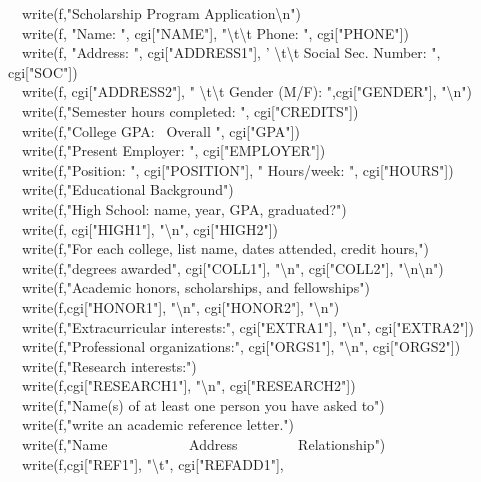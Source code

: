 {{\ \ write(f,"Scholarship Program
Application{\textbackslash}n") \\
\ \ write(f, "Name: ",
cgi["NAME"],
"{\textbackslash}t{\textbackslash}t Phone: ", cgi["PHONE"]) \\
\ \ write(f, "Address: ", cgi["ADDRESS1"], '
{\textbackslash}t{\textbackslash}t Social Sec. Number: ", cgi["SOC"]) \\
\ \ write(f, cgi["ADDRESS2"],
" {\textbackslash}t{\textbackslash}t Gender (M/F):
",cgi["GENDER"],
"{\textbackslash}n") \\
\ \ write(f,"Semester hours completed: ",
cgi["CREDITS"]) \\
\ \ write(f,"College GPA: \ Overall ",
cgi["GPA"]) \\
\ \ write(f,"Present Employer: ",
cgi["EMPLOYER"]) \\
\ \ write(f,"Position: ", cgi["POSITION"], " Hours/week: ", cgi["HOURS"]) \\
\ \ write(f,"Educational Background") \\
\ \ write(f,"High School: name, year, GPA,
		graduated?") \\
\ \ write(f, cgi["HIGH1"],
"{\textbackslash}n",
cgi["HIGH2"]) \\
\ \ write(f,"For each college, list name, dates attended,
credit hours,") \\
\ \ write(f,"degrees awarded", cgi["COLL1"], "{\textbackslash}n", cgi["COLL2"],
"{\textbackslash}n{\textbackslash}n") \\
\ \ write(f,"Academic honors, scholarships, and
fellowships") \\
\ \ write(f,cgi["HONOR1"],
"{\textbackslash}n",
cgi["HONOR2"],
"{\textbackslash}n") \\
\ \ write(f,"Extracurricular interests:", cgi["EXTRA1"],
"{\textbackslash}n",
cgi["EXTRA2"]) \\
\ \ write(f,"Professional organizations:",
cgi["ORGS1"],
"{\textbackslash}n",
cgi["ORGS2"]) \\
\ \ write(f,"Research interests:") \\
\ \ write(f,cgi["RESEARCH1"],
"{\textbackslash}n",
cgi["RESEARCH2"]) \\
\ \ write(f,"Name(s) of at least one person you have asked
to") \\
\ \ write(f,"write an academic reference
letter.") \\
\ \ write(f,"Name \ \ \ \ \ \ \ \ \ \ \ Address
\ \ \ \ \ \ \ \ Relationship") \\
\ \ write(f,cgi["REF1"],
"{\textbackslash}t",
cgi["REFADD1"],
}}
